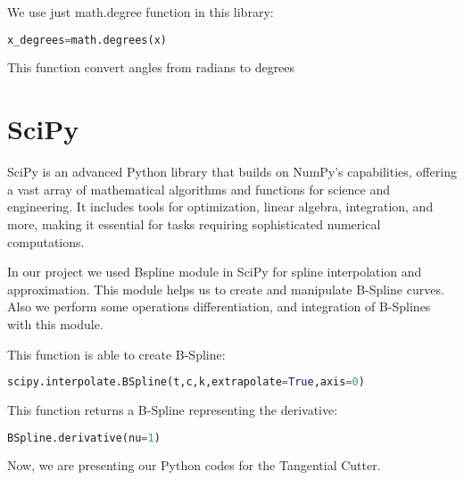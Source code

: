 We use just math.degree function in this library:
\begin{lstlisting}[language=Python]
x_degrees=math.degrees(x)
\end{lstlisting}  

This function convert angles from radians to degrees

\section*{SciPy}

SciPy is an advanced Python library that builds on NumPy's capabilities,
offering a vast array of mathematical algorithms and functions for science and engineering.
It includes tools for optimization, linear algebra, integration, and more,
making it essential for tasks requiring sophisticated numerical computations.

In our project we used Bspline module in SciPy for spline interpolation and approximation.
This module helps us to create and manipulate B-Spline curves.
Also we perform some operations differentiation, and integration of B-Splines with this module.

This function is able to create B-Spline:
\begin{lstlisting}[language=Python]
scipy.interpolate.BSpline(t,c,k,extrapolate=True,axis=0)
\end{lstlisting}

This function returns a B-Spline representing the derivative:
\begin{lstlisting}[language=Python]
BSpline.derivative(nu=1)
\end{lstlisting}

Now, we are presenting our Python codes for the Tangential Cutter.


\bigskip

